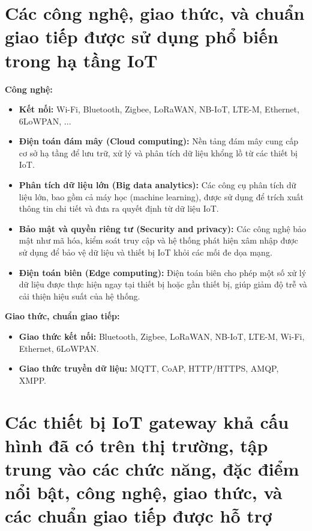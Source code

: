     \section{Các công nghệ, giao thức, và chuẩn giao tiếp được sử dụng phổ biến trong hạ tầng IoT}
        \textbf{Công nghệ:} 
        \begin{itemize}
            \item \textbf{Kết nối:} Wi-Fi, Bluetooth, Zigbee, LoRaWAN, NB-IoT, LTE-M, Ethernet, 6LoWPAN, ...
            \item \textbf{Điện toán đám mây (Cloud computing):} Nền tảng đám mây cung cấp cơ sở hạ tầng để lưu trữ, xử lý và phân tích dữ liệu khổng lồ từ các thiết bị IoT. 
            \item \textbf{Phân tích dữ liệu lớn (Big data analytics):} Các công cụ phân tích dữ liệu lớn, bao gồm cả máy học (machine learning), được sử dụng để trích xuất thông tin chi tiết và đưa ra quyết định từ dữ liệu IoT. 
            \item \textbf{Bảo mật và quyền riêng tư (Security and privacy):} Các công nghệ bảo mật như mã hóa, kiểm soát truy cập và hệ thống phát hiện xâm nhập được sử dụng để bảo vệ dữ liệu và thiết bị IoT khỏi các mối đe dọa mạng. 
            \item \textbf{Điện toán biên (Edge computing):} Điện toán biên cho phép một số xử lý dữ liệu được thực hiện ngay tại thiết bị hoặc gần thiết bị, giúp giảm độ trễ và cải thiện hiệu suất của hệ thống. 
        \end{itemize}

        \textbf{Giao thức, chuẩn giao tiếp:}
        \begin{itemize}
            \item \textbf{Giao thức kết nối:} Bluetooth, Zigbee, LoRaWAN, NB-IoT, LTE-M, Wi-Fi, Ethernet, 6LoWPAN.
            \item \textbf{Giao thức truyền dữ liệu:} MQTT, CoAP, HTTP/HTTPS, AMQP, XMPP.
        \end{itemize}
    \section{Các thiết bị IoT gateway khả cấu hình đã có trên thị trường, tập trung vào các chức năng, đặc điểm nổi bật, công nghệ, giao thức, và các chuẩn giao tiếp được hỗ trợ}
